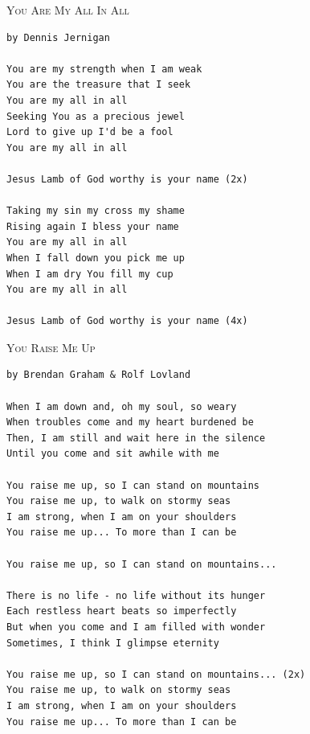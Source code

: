 \documentclass[10pt,oneside,footinclude=true,headinclude=true]{scrbook} %
\newcommand\songtitle[1]{
	\hspace*{-3.7mm}\Large\textsc{#1}
}
\begin{document}

\bigskip
\medskip
\songtitle{You Are My All In All}
\begin{verbatim}
by Dennis Jernigan

You are my strength when I am weak
You are the treasure that I seek
You are my all in all
Seeking You as a precious jewel
Lord to give up I'd be a fool
You are my all in all

Jesus Lamb of God worthy is your name (2x)

Taking my sin my cross my shame
Rising again I bless your name
You are my all in all
When I fall down you pick me up
When I am dry You fill my cup
You are my all in all

Jesus Lamb of God worthy is your name (4x)
\end{verbatim}


\bigskip
\medskip
\songtitle{You Raise Me Up}
\begin{verbatim}
by Brendan Graham & Rolf Lovland

When I am down and, oh my soul, so weary
When troubles come and my heart burdened be
Then, I am still and wait here in the silence
Until you come and sit awhile with me

You raise me up, so I can stand on mountains
You raise me up, to walk on stormy seas
I am strong, when I am on your shoulders
You raise me up... To more than I can be

You raise me up, so I can stand on mountains...

There is no life - no life without its hunger
Each restless heart beats so imperfectly
But when you come and I am filled with wonder
Sometimes, I think I glimpse eternity

You raise me up, so I can stand on mountains... (2x)
You raise me up, to walk on stormy seas
I am strong, when I am on your shoulders
You raise me up... To more than I can be
\end{verbatim}

\end{document}
